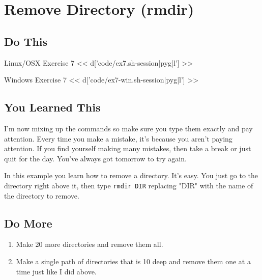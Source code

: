 \chapter{Remove Directory (rmdir)}

\section{Do This}

\begin{code}{Linux/OSX Exercise 7}
<< d['code/ex7.sh-session|pyg|l'] >>
\end{code}

\begin{code}{Windows Exercise 7}
<< d['code/ex7-win.sh-session|pyg|l'] >>
\end{code}

\section{You Learned This}

I'm now mixing up the commands so make sure you type them exactly and pay attention.
Every time you make a mistake, it's because you aren't paying attention.  If you
find yourself making many mistakes, then take a break or just quit for the day.
You've always got tomorrow to try again.

In this example you learn how to remove a directory.  It's easy. You just
go to the directory right above it, then type \verb|rmdir DIR| replacing "DIR"
with the name of the directory to remove.

\section{Do More}

\begin{enumerate}
\item Make 20 more directories and remove them all.
\item Make a single path of directories that is 10 deep and remove them one at a
    time just like I did above.
\end{enumerate}

